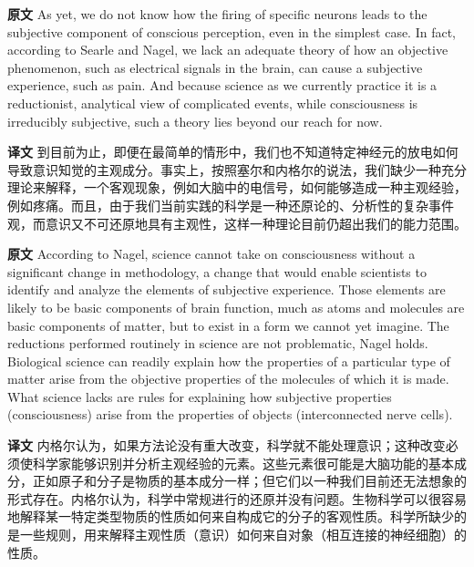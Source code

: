 \documentclass[UTF8]{ctexart}
\newenvironment{english}{\par\small\noindent\textbf{原文}\quad\ignorespaces}{\par}
\newenvironment{zhtranslation}{\par\noindent\textbf{译文}\quad\ignorespaces}{\par\vspace{0.35em}}
\begin{document}
\begin{english}
As yet, we do not know how the firing of specific neurons leads to the subjective component of conscious perception, even in the simplest case. In fact, according to Searle and Nagel, we lack an adequate theory of how an objective phenomenon, such as electrical signals in the brain, can cause a subjective experience, such as pain. And because science as we currently practice it is a reductionist, analytical view of complicated events, while consciousness is irreducibly subjective, such a theory lies beyond our reach for now.
\end{english}
\begin{zhtranslation}
到目前为止，即便在最简单的情形中，我们也不知道特定神经元的放电如何导致意识知觉的主观成分。事实上，按照塞尔和内格尔的说法，我们缺少一种充分理论来解释，一个客观现象，例如大脑中的电信号，如何能够造成一种主观经验，例如疼痛。而且，由于我们当前实践的科学是一种还原论的、分析性的复杂事件观，而意识又不可还原地具有主观性，这样一种理论目前仍超出我们的能力范围。\end{zhtranslation}

\begin{english}
According to Nagel, science cannot take on consciousness without a significant change in methodology, a change that would enable scientists to identify and analyze the elements of subjective experience. Those elements are likely to be basic components of brain function, much as atoms and molecules are basic components of matter, but to exist in a form we cannot yet imagine. The reductions performed routinely in science are not problematic, Nagel holds. Biological science can readily explain how the properties of a particular type of matter arise from the objective properties of the molecules of which it is made. What science lacks are rules for explaining how subjective properties (consciousness) arise from the properties of objects (interconnected nerve cells).
\end{english}
\begin{zhtranslation}
内格尔认为，如果方法论没有重大改变，科学就不能处理意识；这种改变必须使科学家能够识别并分析主观经验的元素。这些元素很可能是大脑功能的基本成分，正如原子和分子是物质的基本成分一样；但它们以一种我们目前还无法想象的形式存在。内格尔认为，科学中常规进行的还原并没有问题。生物科学可以很容易地解释某一特定类型物质的性质如何来自构成它的分子的客观性质。科学所缺少的是一些规则，用来解释主观性质（意识）如何来自对象（相互连接的神经细胞）的性质。\end{zhtranslation}
\end{document}
